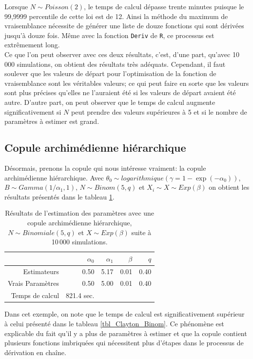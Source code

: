 \documentclass{article}
\begin{document}
	Lorsque $N \sim Poisson(2)$, le temps de calcul dépasse trente minutes puisque le 99,9999 percentile de cette loi est de 12. Ainsi la méthode du maximum de vraisemblance nécessite de générer une liste de douze fonctions qui sont dérivées jusqu'à douze fois. Même avec la fonction \texttt{Deriv} de \texttt{R}, ce processus est extrêmement long.\\
		
	Ce que l'on peut observer avec ces deux résultats, c'est, d'une part, qu'avec 10\,000 simulations, on obtient des résultats très adéquats. Cependant, il faut soulever que les valeurs de départ pour l'optimisation de la fonction de vraisemblance sont les véritables valeurs; ce qui peut faire en sorte que les valeurs sont plus précises qu'elles ne l'auraient été si les valeurs de départ avaient été autre. D'autre part, on peut observer que le temps de calcul augmente significativement si $N$ peut prendre des valeurs supérieures à 5 et si le nombre de paramètres à estimer est grand.

	\subsection{Copule archimédienne hiérarchique}
	Désormais, prenons la copule qui nous intéresse vraiment: la copule archimédienne hiérarchique. Avec $\theta_0 \sim logarithmique\left(\gamma = 1-\exp(-\alpha_0)\right)$, $B \sim Gamma(1/\alpha_1, 1)$, $N \sim Binom(5,q)$ et $X_i \sim X \sim Exp(\beta)$ on obtient les résultats présentés dans le tableau \ref{tbl_archi_hierar}.
	\begin{table}[H]
		\centering
		\begin{tabular}{rrrrr}
			\hline
			& $\alpha_{0}$ & $\alpha_{1}$ & $\beta$ & $q$ \\ 
			\hline
			Estimateurs & 0.50 & 5.17 & 0.01 & 0.40 \\ 
			Vrais Paramètres & 0.50 & 5.00 & 0.01 & 0.40 \\ 
			\hline
			Temps de calcul & 821.4 sec. \\
			\hline
		\end{tabular}
		\caption[Estimations avec une copule archimédienne hiérarchique et $N\sim Binomiale$]{Résultats de l'estimation des paramètres avec une copule archimédienne hiérarchique, $N \sim Binomiale(5, q)$ et $X \sim Exp(\beta)$ suite à 10\,000 simulations.} \label{tbl_archi_hierar}
	\end{table}

	Dans cet exemple, on note que le temps de calcul est significativement supérieur à celui présenté dans le tableau \ref{tbl_Clayton_Binom}. Ce phénomène est explicable du fait qu'il y a plus de paramètres à estimer et que la copule contient plusieurs fonctions imbriquées qui nécessitent plus d'étapes dans le processus de dérivation en chaîne.
	
\end{document}
